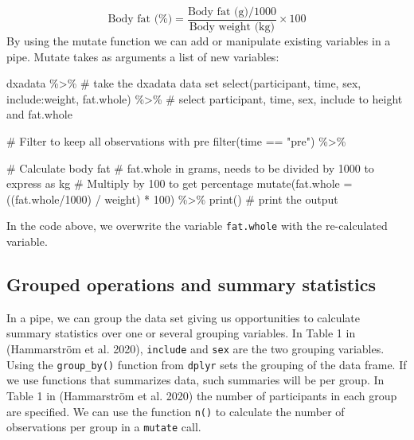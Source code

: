 \documentclass[
  11pt,
  letterpaper,
]{scrbook}
\newenvironment{Shaded}{\begin{snugshade}}{\end{snugshade}}
\newcommand{\AttributeTok}[1]{\textcolor[rgb]{0.40,0.45,0.13}{#1}}
\newcommand{\CommentTok}[1]{\textcolor[rgb]{0.37,0.37,0.37}{#1}}
\newcommand{\DecValTok}[1]{\textcolor[rgb]{0.68,0.00,0.00}{#1}}
\newcommand{\FunctionTok}[1]{\textcolor[rgb]{0.28,0.35,0.67}{#1}}
\newcommand{\NormalTok}[1]{\textcolor[rgb]{0.00,0.23,0.31}{#1}}
\newcommand{\SpecialCharTok}[1]{\textcolor[rgb]{0.37,0.37,0.37}{#1}}
\newcommand{\StringTok}[1]{\textcolor[rgb]{0.13,0.47,0.30}{#1}}
\begin{document}
\[\text{Body fat (\%)} = \frac{\text{Body fat (g)}/1000}{\text{Body weight (kg)}} \times 100\]
By using the mutate function we can add or manipulate existing variables
in a pipe. Mutate takes as arguments a list of new variables:

\begin{Shaded}
\begin{Highlighting}[numbers=left,,]
\NormalTok{dxadata }\SpecialCharTok{\%\textgreater{}\%} \CommentTok{\# take the dxadata data set}
  \FunctionTok{select}\NormalTok{(participant, time, sex, include}\SpecialCharTok{:}\NormalTok{weight, fat.whole) }\SpecialCharTok{\%\textgreater{}\%} 
  \CommentTok{\# select participant, time, sex, include to height and fat.whole}
  
  \CommentTok{\# Filter to keep all observations with pre}
  \FunctionTok{filter}\NormalTok{(time }\SpecialCharTok{==} \StringTok{"pre"}\NormalTok{) }\SpecialCharTok{\%\textgreater{}\%}
  
  \CommentTok{\# Calculate body fat}
  \CommentTok{\# fat.whole in grams, needs to be divided by 1000 to express as kg}
  \CommentTok{\# Multiply by 100 to get percentage}
  \FunctionTok{mutate}\NormalTok{(}\AttributeTok{fat.whole =}\NormalTok{ ((fat.whole}\SpecialCharTok{/}\DecValTok{1000}\NormalTok{) }\SpecialCharTok{/}\NormalTok{ weight) }\SpecialCharTok{*} \DecValTok{100}\NormalTok{) }\SpecialCharTok{\%\textgreater{}\%}
  \FunctionTok{print}\NormalTok{() }\CommentTok{\# print the output}
\end{Highlighting}
\end{Shaded}

In the code above, we overwrite the variable \texttt{fat.whole} with the
re-calculated variable.

\hypertarget{grouped-operations-and-summary-statistics}{%
\subsection{Grouped operations and summary
statistics}\label{grouped-operations-and-summary-statistics}}

In a pipe, we can group the data set giving us opportunities to
calculate summary statistics over one or several grouping variables. In
Table 1 in (Hammarström et al. 2020), \texttt{include} and \texttt{sex}
are the two grouping variables. Using the \texttt{group\_by()} function
from \texttt{dplyr} sets the grouping of the data frame. If we use
functions that summarizes data, such summaries will be per group. In
Table 1 in (Hammarström et al. 2020) the number of participants in each
group are specified. We can use the function \texttt{n()} to calculate
the number of observations per group in a \texttt{mutate} call.
\end{document}
